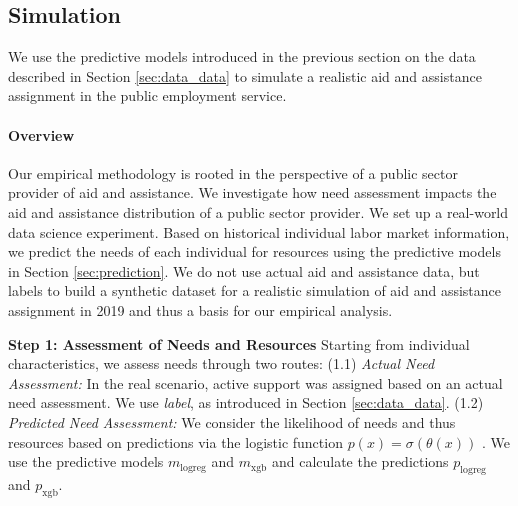 \documentclass{article} %
\begin{document}
\subsection{Simulation}
\label{sec:simulation}

We use the predictive models introduced in the previous section on the data described in Section \ref{sec:data_data} to simulate a realistic aid and assistance assignment in the public employment service.

\paragraph{Overview}
Our empirical methodology is rooted in the perspective of a public sector provider of aid and assistance. We investigate how need assessment impacts the aid and assistance distribution of a public sector provider. We set up a real-world data science experiment. Based on historical individual labor market information, we predict the needs of each individual for resources using the predictive models in Section \ref{sec:prediction}. We do not use actual aid and assistance data, but labels to build a synthetic dataset for a realistic simulation of aid and assistance assignment in 2019 and thus a basis for our empirical analysis.


\textbf{Step 1: Assessment of Needs and Resources}
Starting from individual characteristics, we assess needs through two routes: (1.1) \emph{Actual Need Assessment:} In the real scenario, active support was assigned based on an actual need assessment. We use \emph{label}, as introduced in Section \ref{sec:data_data}. (1.2) \emph{Predicted Need Assessment:} We consider the likelihood of needs and thus resources based on predictions via the logistic function $p(x)=\sigma(\theta(x))$ . We use the predictive models $m_{\mathrm{logreg}}$ and $m_{\mathrm{xgb}}$ and calculate the predictions $p_{\mathrm{logreg}}$ and $p_{\mathrm{xgb}}$.
\end{document}
